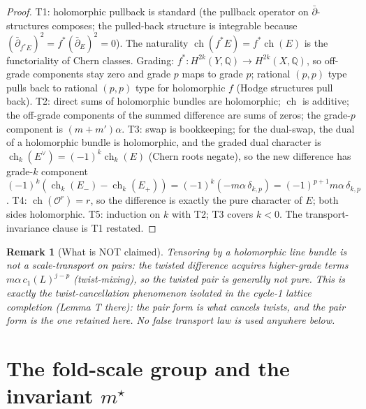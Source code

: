 \documentclass[11pt]{article}
\newtheorem{remark}[theorem]{Remark}
\newcommand{\ch}{\operatorname{ch}}
\newcommand{\Oo}{\mathcal{O}}
\newcommand{\Q}{\mathbb{Q}}
\begin{document}
\begin{proof}
T1: holomorphic pullback is standard (the pullback operator on
$\bar\partial$-structures composes; the pulled-back structure is integrable
because $(\bar\partial_{f^*E})^2=f^*(\bar\partial_E)^2=0$).  The
naturality $\ch(f^*E)=f^*\ch(E)$ is the functoriality of Chern classes.
Grading: $f^*\colon H^{2k}(Y,\Q)\to H^{2k}(X,\Q)$, so off-grade components
stay zero and grade $p$ maps to grade $p$; rational $(p,p)$ type pulls back
to rational $(p,p)$ type for holomorphic $f$ (Hodge structures pull back).
T2: direct sums of holomorphic bundles are holomorphic; $\ch$ is additive;
the off-grade components of the summed difference are sums of zeros; the
grade-$p$ component is $(m+m')\alpha$.  T3: swap is bookkeeping; for the
dual-swap, the dual of a holomorphic bundle is holomorphic, and the graded
dual character is $\ch_k(E^\vee)=(-1)^k\ch_k(E)$ (Chern roots negate), so
the new difference has grade-$k$ component
$(-1)^k(\ch_k(E_-)-\ch_k(E_+))=(-1)^k(-m\alpha\,\delta_{k,p})
=(-1)^{p+1}m\alpha\,\delta_{k,p}$.
T4: $\ch(\Oo^r)=r$, so the difference is exactly the pure character of $E$;
both sides holomorphic.  T5: induction on $k$ with T2; T3 covers $k<0$.
The transport-invariance clause is T1 restated.
\end{proof}

\begin{remark}[What is NOT claimed]
\label{rem:notwist}
Tensoring by a holomorphic line bundle is \emph{not} a scale-transport on
pairs: the twisted difference acquires higher-grade terms
$m\alpha\,c_1(L)^{j-p}$ (twist-mixing), so the twisted pair is generally not
pure.  This is exactly the twist-cancellation phenomenon isolated in the
cycle-1 lattice completion (Lemma T there): the pair \emph{form} is what
cancels twists, and the pair form is the one retained here.  No false
transport law is used anywhere below.
\end{remark}

\section{The fold-scale group and the invariant \texorpdfstring{$m^\star$}{m*}}
\label{sec:group}
\end{document}
